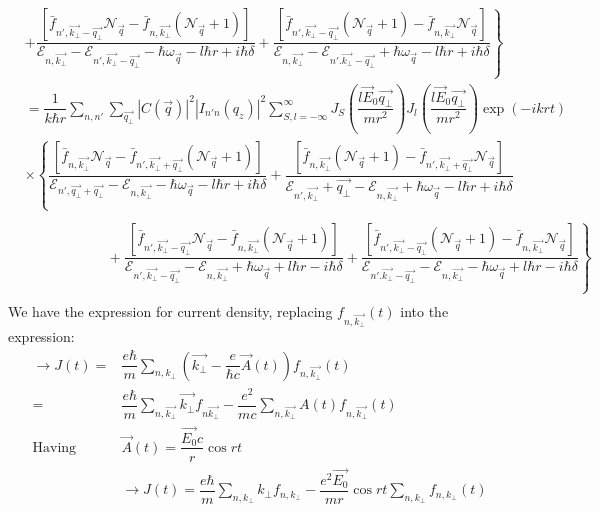 \documentclass{article}
\begin{document}
\begin{align*}
    & + \left. \dfrac{\left[\bar{f}_{n',\vec{k_\bot}-\vec{q_\bot}}\mathcal{N}_{\vec{q}}-\bar{f}_{n,\vec{k_\bot}}\left(\mathcal{N}_{\vec{q}}+1 \right) \right]}{\mathcal{E}_{n,\vec{k_\bot}}-\mathcal{E}_{n',\vec{k_\bot}-\vec{q_\bot}}-\hbar\omega_{\vec{q}}-l\hbar r + i\hbar\delta} + \dfrac{\left[\bar{f}_{n',\vec{k_\bot}-\vec{q_\bot}}\left(\mathcal{N}_{\vec{q}}+1 \right)-\bar{f}_{n,\vec{k_\bot}}\mathcal{N}_{\vec{q}} \right]}{\mathcal{E}_{n,\vec{k_\bot}}-\mathcal{E}_{n'.\vec{k_\bot}-\vec{q_\bot}}+\hbar\omega_{\vec{q}}-l\hbar r + i\hbar\delta} \right\} \\
        & = \dfrac{1}{k\hbar r}\sum_{n,n'}\sum_{\vec{q_\bot}}\left|C\left(\vec{q}\right) \right|^2\left|I_{n'n}\left(q_z \right) \right|^2\sum^{\infty}_{S,l=-\infty} J_S \left(\dfrac{l\vec{E}_0\vec{q_\bot}}{mr^2} \right)J_l \left(\dfrac{l\vec{E}_0\vec{q_\bot}}{mr^2} \right) \exp(-ikrt) \\
    &\times \left\{\dfrac{\left[\bar{f}_{n,\vec{k_\bot}}\mathcal{N}_{\vec{q}}-\bar{f}_{n',\vec{k_\bot}+\vec{q_\bot}}\left(\mathcal{N}_{\vec{q}}+1 \right) \right]}{\mathcal{E}_{n',\vec{q_\bot}+\vec{q_\bot}}-\mathcal{E}_{n,\vec{k_\bot}}-\hbar\omega_{\vec{q}}-l\hbar r + i\hbar\delta}+\dfrac{\left[\bar{f}_{n,\vec{k_\bot}}\left(\mathcal{N}_{\vec{q}}+1 \right)-\bar{f}_{n',\vec{k_\bot}+\vec{q_\bot}}\mathcal{N}_{\vec{q}} \right]}{\mathcal{E}_{n',\vec{k_\bot}}+\vec{q_\bot}-\mathcal{E}_{n,\vec{k_\bot}}+\hbar\omega_{\vec{q}}-l\hbar r+i\hbar\delta} \right. \\
\end{align*}
\begin{align*}
    \phantom{\to f_{n,\vec{k_\bot}}=\dfrac{1}{k\hbar r}}+ \left. \dfrac{\left[\bar{f}_{n',\vec{k_\bot}-\vec{q_\bot}}\mathcal{N}_{\vec{q}}-\bar{f}_{n,\vec{k_\bot}}\left(\mathcal{N}_{\vec{q}}+1 \right) \right]}{\mathcal{E}_{n',\vec{k_\bot}-\vec{q_\bot}}-\mathcal{E}_{n,\vec{k_\bot}}+\hbar\omega_{\vec{q}}+l\hbar r - i\hbar\delta} + \dfrac{\left[\bar{f}_{n',\vec{k_\bot}-\vec{q_\bot}}\left(\mathcal{N}_{\vec{q}}+1 \right)-\bar{f}_{n,\vec{k_\bot}}\mathcal{N}_{\vec{q}} \right]}{\mathcal{E}_{n'.\vec{k_\bot}-\vec{q_\bot}}-\mathcal{E}_{n,\vec{k_\bot}}-\hbar\omega_{\vec{q}}+l\hbar r - i\hbar\delta} \right\} \\
\end{align*}
We have the expression for current density, replacing $f_{n,\vec{k_\bot}}(t)$ into the expression:
\begin{align*}
    \to J(t) = & \dfrac{e\hbar}{m} \sum_{n,k_\bot}\left(\vec{k_\bot}-\dfrac{e}{\hbar c} \vec{A}(t)\right) f_{n,\vec{k_\bot}}(t) \\
     = & \dfrac{e\hbar}{m}\sum_{n,\vec{k_\bot}}\vec{k_\bot}f_{n\vec{k_\bot}}-\dfrac{e^2}{mc}\sum_{n,\vec{k_\bot}}A(t)f_{n,\vec{k_\bot}}(t)\\
     \text{Having } & \vec{A}(t) = \dfrac{\vec{E_0}c}{r}\cos{rt}\\
     & \to J(t) = \dfrac{e\hbar}{m}\sum_{n,k_\bot}k_\bot f_{n,k_\bot}-\dfrac{e^2\vec{E_0}}{mr} \cos{rt} \sum_{n,k_\bot}f_{n,k_\bot}(t)
\end{align*}
\end{document}
